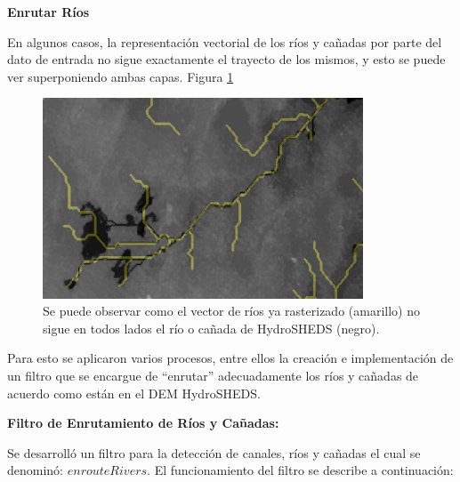 \documentclass[10pt,a4paper, twoside]{report}
\begin{document}
\textbf{Enrutar Ríos}

En algunos casos, la representación vectorial de los ríos y cañadas por parte del dato de entrada no sigue exactamente el trayecto de los mismos, y esto se puede ver superponiendo ambas capas. Figura \ref{riverToEnroute}

\begin{figure}[H]
   \centering      
   \includegraphics[width=0.85\textwidth]{imagenes/riverToEnroute.jpg}
 \caption{Se puede observar como el vector de ríos ya rasterizado (amarillo) no sigue en todos lados el río o cañada de HydroSHEDS (negro).}
 \label{riverToEnroute}
\end{figure}

Para esto se aplicaron varios procesos, entre ellos la creación e implementación de un filtro que se encargue de "`enrutar"' adecuadamente los ríos y cañadas de acuerdo como están en el DEM HydroSHEDS. 

\textbf{Filtro de Enrutamiento de Ríos y Cañadas:} 

Se desarrolló un filtro para la detección de canales, ríos y cañadas el cual se denominó: $enrouteRivers$. El funcionamiento del filtro se describe a continuación:
\end{document}
